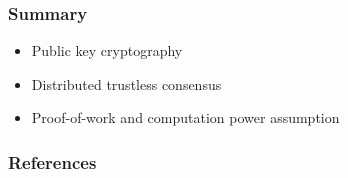 \documentclass{beamer}
\begin{document}
\begin{frame}
\frametitle{Summary}

\begin{itemize}
  \item Public key cryptography
  \item Distributed trustless consensus
  \item Proof-of-work and computation power assumption
\end{itemize}

\end{frame}

\begin{frame}
\frametitle{References}

\end{frame}
\end{document}
